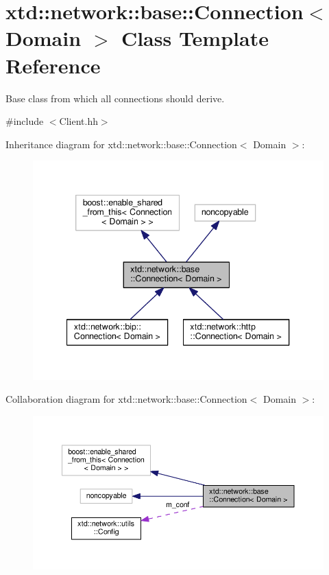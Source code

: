 \hypertarget{classxtd_1_1network_1_1base_1_1Connection}{}\section{xtd\+:\+:network\+:\+:base\+:\+:Connection$<$ Domain $>$ Class Template Reference}
\label{classxtd_1_1network_1_1base_1_1Connection}


Base class from which all connections should derive.  




{\ttfamily \#include $<$Client.\+hh$>$}



Inheritance diagram for xtd\+:\+:network\+:\+:base\+:\+:Connection$<$ Domain $>$\+:
\nopagebreak
\begin{figure}[H]
\begin{center}
\leavevmode
\includegraphics[width=340pt]{classxtd_1_1network_1_1base_1_1Connection__inherit__graph}
\end{center}
\end{figure}


Collaboration diagram for xtd\+:\+:network\+:\+:base\+:\+:Connection$<$ Domain $>$\+:
\nopagebreak
\begin{figure}[H]
\begin{center}
\leavevmode
\includegraphics[width=350pt]{classxtd_1_1network_1_1base_1_1Connection__coll__graph}
\end{center}
\end{figure}
